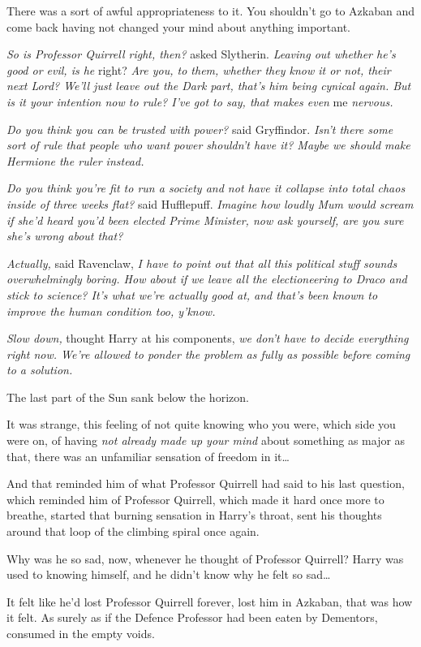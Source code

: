 There was a sort of awful appropriateness to it. You shouldn't go to Azkaban
and come back having not changed your mind about anything important.

\emph{So is Professor Quirrell right, then?} asked Slytherin. \emph{Leaving out
whether he's good or evil, is he} right? \emph{Are you, to them, whether they
know it or not, their next Lord? We'll just leave out the Dark part, that's him
being cynical again. But is it your intention now to rule? I've got to say,
that makes even} me \emph{nervous.}

\emph{Do you think you can be trusted with power?} said Gryffindor. \emph{Isn't
there some sort of rule that people who want power shouldn't have it? Maybe we
should make Hermione the ruler instead.}

\emph{Do you think you're fit to run a society and not have it collapse into
total chaos inside of three weeks flat?} said Hufflepuff. \emph{Imagine how
loudly Mum would scream if she'd heard you'd been elected Prime Minister, now
ask yourself, are you sure she's wrong about that?}

\emph{Actually,} said Ravenclaw, \emph{I have to point out that all this
political stuff sounds overwhelmingly boring. How about if we leave all the
electioneering to Draco and stick to science? It's what we're actually good at,
and that's been known to improve the human condition too, y'know.}

\emph{Slow down,} thought Harry at his components, \emph{we don't have to
decide everything right now. We're allowed to ponder the problem as fully as
possible before coming to a solution.}

The last part of the Sun sank below the horizon.

It was strange, this feeling of not quite knowing who you were, which side you
were on, of having \emph{not already made up your mind} about something as
major as that, there was an unfamiliar sensation of freedom in it…

And that reminded him of what Professor Quirrell had said to his last question,
which reminded him of Professor Quirrell, which made it hard once more to
breathe, started that burning sensation in Harry's throat, sent his thoughts
around that loop of the climbing spiral once again.

Why was he so sad, now, whenever he thought of Professor Quirrell? Harry was
used to knowing himself, and he didn't know why he felt so sad…

It felt like he'd lost Professor Quirrell forever, lost him in Azkaban, that
was how it felt. As surely as if the Defence Professor had been eaten by
Dementors, consumed in the empty voids.


